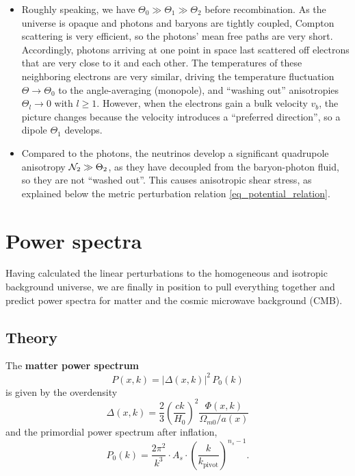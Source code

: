 \documentclass[10pt,a4paper]{article}
\begin{document}
\begin{itemize}
\item
Roughly speaking, we have $\Theta_0 \gg \Theta_1 \gg \Theta_2$ before recombination.
As the universe is opaque and photons and baryons are tightly coupled,
Compton scattering is very efficient, so the photons' mean free paths are very short.
Accordingly, photons arriving at one point in space last scattered off electrons that are very close to it and each other.
The temperatures of these neighboring electrons are very similar,
driving the temperature fluctuation $\Theta \rightarrow \Theta_0$
to the angle-averaging (monopole),
and ``washing out'' anisotropies $\Theta_l \rightarrow 0$ with $l \geq 1$.
However, when the electrons gain a bulk velocity $v_b$,
the picture changes because the velocity introduces a ``preferred direction'',
so a dipole $\Theta_1$ develops.

\item
Compared to the photons, the neutrinos develop a significant quadrupole anisotropy $\mathcal{N}_2 \gg \Theta_2$,
as they have decoupled from the baryon-photon fluid, so they are not ``washed out''.
This causes anisotropic shear stress, as explained below the metric perturbation relation \eqref{eq_potential_relation}.
\end{itemize}

\clearpage
\section{Power spectra}
\label{sec_power_spectra}

Having calculated the linear perturbations to the homogeneous and isotropic background universe,
we are finally in position to pull everything together and predict power spectra for matter and the cosmic microwave background (CMB).

\subsection{Theory}

The \textbf{matter power spectrum}
\begin{equation}
	P(x,k) = |\Delta(x,k)|^2 \, P_0(k)
\label{eq_Pk}
\end{equation}
is given by the overdensity
\begin{equation}
	\Delta(x,k) = \frac23 \left( \frac{ck}{H_0} \right)^2 \frac{\Phi(x,k)}{\Omega_{m0}/a(x)}
\end{equation}
and the primordial power spectrum after inflation,
\begin{equation}
	P_0(k) = \frac{2\pi^2}{k^3} \cdot A_s \cdot \left( \frac{k}{k_\text{pivot}} \right)^{n_s-1}.
\label{eq_P_primordial}
\end{equation}
\end{document}

